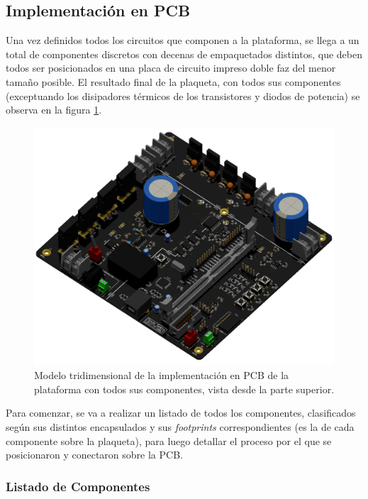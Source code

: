 \subsection{Implementación en PCB}

Una vez definidos todos los circuitos que componen a la plataforma, se llega a un total de { componentes} discretos con decenas de empaquetados distintos, que deben todos ser posicionados en una placa de circuito impreso doble faz del menor tamaño posible. El resultado final de la plaqueta, con todos sus componentes (exceptuando los disipadores térmicos de los transistores y diodos de potencia) se observa en la figura \ref{fig:PCB_3D}.\\

\begin{figure}[h]
    \centering
    \includegraphics[scale=0.32]{Imagenes/PCB 3D Raytracing.png}
    \caption{Modelo tridimensional de la implementación en PCB de la plataforma con todos sus componentes, vista desde la parte superior.}
    \label{fig:PCB_3D}
\end{figure}

Para comenzar, se va a realizar un listado de todos los componentes, clasificados según sus distintos encapsulados y sus \textit{footprints} correspondientes (es la  de cada componente sobre la plaqueta), para luego detallar el proceso por el que se posicionaron y conectaron sobre la PCB.\\

\subsubsection{Listado de Componentes}

